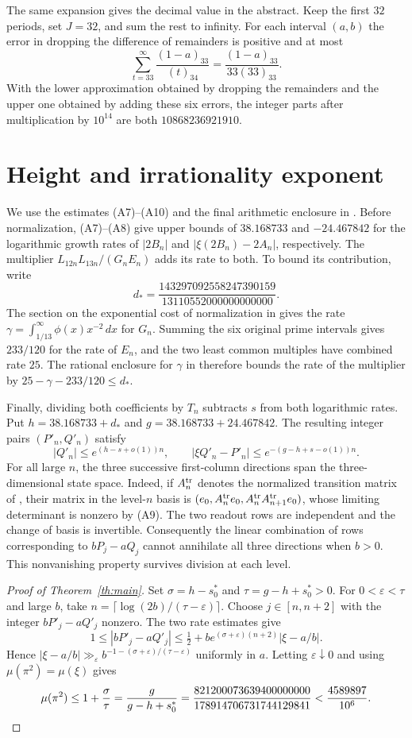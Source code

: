 \documentclass[11pt]{article}
\begin{document}
The same expansion gives the decimal value in the abstract. Keep
the first $32$ periods, set $J=32$, and sum the rest to infinity.
For each interval $(a,b)$ the error in dropping the difference of
remainders is positive and at most
\[
 \sum_{t=33}^\infty\frac{(1-a)_{33}}{(t)_{34}}
 =\frac{(1-a)_{33}}{33(33)_{33}} .
\]
With the lower approximation obtained by dropping the remainders and
the upper one obtained by adding these six errors, the integer parts
after multiplication by $10^{14}$ are both $10868236921910$.

\section{Height and irrationality exponent}
We use the estimates (A7)--(A10) and the final arithmetic enclosure
in \cite{LC}. Before normalization, (A7)--(A8) give upper bounds of
$38.168733$ and $-24.467842$ for the logarithmic growth rates of
$|2B_n|$ and $|\xi(2B_n)-2A_n|$, respectively.
The multiplier $L_{12n}L_{13n}/(G_nE_n)$ adds its rate to both.
To bound its contribution, write
\[
 d_*=\frac{143297092558247390159}{13110552000000000000}.
\]
The section on the exponential cost of normalization in \cite{LC}
gives the rate $\gamma=\int_{1/13}^{\infty}\phi(x)x^{-2}\,dx$ for
$G_n$. Summing the six original prime intervals gives $233/120$ for
the rate of $E_n$, and the two least common multiples have combined
rate $25$. The rational enclosure for $\gamma$ in \cite{LC} therefore
bounds the rate of the multiplier by $25-\gamma-233/120\le d_*$.

Finally, dividing both coefficients by $T_n$ subtracts $s$ from
both logarithmic rates. Put $h=38.168733+d_*$ and
$g=38.168733+24.467842$. The resulting integer pairs
$(P'_n,Q'_n)$ satisfy
\[
 |Q'_n|\le e^{(h-s+o(1))n},\qquad
 |\xi Q'_n-P'_n|\le e^{-(g-h+s-o(1))n}.
\]
For all large $n$, the three successive first-column directions span
the three-dimensional state space. Indeed, if $A_n^{\rm tr}$ denotes
the normalized transition matrix of \cite{LC}, their matrix in the
level-$n$ basis is
$(e_0,A_n^{\rm tr}e_0,A_n^{\rm tr}A_{n+1}^{\rm tr}e_0)$, whose
limiting determinant is nonzero by (A9). The two readout rows are
independent and the change of basis is invertible. Consequently the
linear combination of rows corresponding to $bP_j-aQ_j$ cannot
annihilate all three directions when $b>0$. This nonvanishing
property survives division at each level.

\begin{proof}[Proof of Theorem~\ref{th:main}]
Set $\sigma=h-s_0^*$ and $\tau=g-h+s_0^*>0$. For
$0<\varepsilon<\tau$ and large $b$, take
$n=\lceil\log(2b)/(\tau-\varepsilon)\rceil$. Choose $j\in[n,n+2]$
with the integer $bP'_j-aQ'_j$ nonzero. The two rate estimates give
\[
 1\le |bP'_j-aQ'_j|
 \le \tfrac12+b e^{(\sigma+\varepsilon)(n+2)}|\xi-a/b|.
\]
Hence $|\xi-a/b|\gg_\varepsilon
b^{-1-(\sigma+\varepsilon)/(\tau-\varepsilon)}$ uniformly in $a$.
Letting $\varepsilon\downarrow0$ and using $\mu(\pi^2)=\mu(\xi)$
gives
\[
 \mu(\pi^2)\le 1+\frac{\sigma}{\tau}
 =\frac{g}{g-h+s_0^*}
 =\frac{821200073639400000000}{178914706731744129841}
 <\frac{4589897}{10^6}.\qedhere
\]
\end{proof}
\end{document}
